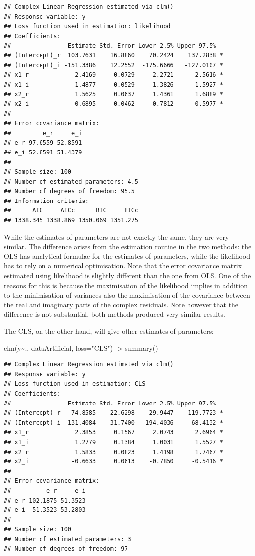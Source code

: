 \documentclass[
]{book}
\newenvironment{Shaded}{\begin{snugshade}}{\end{snugshade}}
\newcommand{\AttributeTok}[1]{\textcolor[rgb]{0.77,0.63,0.00}{#1}}
\newcommand{\FunctionTok}[1]{\textcolor[rgb]{0.00,0.00,0.00}{#1}}
\newcommand{\NormalTok}[1]{#1}
\newcommand{\SpecialCharTok}[1]{\textcolor[rgb]{0.00,0.00,0.00}{#1}}
\newcommand{\StringTok}[1]{\textcolor[rgb]{0.31,0.60,0.02}{#1}}
\begin{document}
\begin{verbatim}
## Complex Linear Regression estimated via clm()
## Response variable: y
## Loss function used in estimation: likelihood
## Coefficients:
##                Estimate Std. Error Lower 2.5% Upper 97.5%  
## (Intercept)_r  103.7631    16.8860    70.2424    137.2838 *
## (Intercept)_i -151.3386    12.2552  -175.6666   -127.0107 *
## x1_r             2.4169     0.0729     2.2721      2.5616 *
## x1_i             1.4877     0.0529     1.3826      1.5927 *
## x2_r             1.5625     0.0637     1.4361      1.6889 *
## x2_i            -0.6895     0.0462    -0.7812     -0.5977 *
## 
## Error covariance matrix:
##         e_r     e_i
## e_r 97.6559 52.8591
## e_i 52.8591 51.4379
## 
## Sample size: 100
## Number of estimated parameters: 4.5
## Number of degrees of freedom: 95.5
## Information criteria:
##      AIC     AICc      BIC     BICc 
## 1338.345 1338.869 1350.069 1351.275
\end{verbatim}

While the estimates of parameters are not exactly the same, they are very similar. The difference arises from the estimation routine in the two methods: the OLS has analytical formulae for the estimates of parameters, while the likelihood has to rely on a numerical optimisation. Note that the error covariance matrix estimated using likelihood is slightly different than the one from OLS. One of the reasons for this is because the maximisation of the likelihood implies in addition to the minimisation of variances also the maximisation of the covariance between the real and imaginary parts of the complex residuals. Note however that the difference is not substantial, both methods produced very similar results.

The CLS, on the other hand, will give other estimates of parameters:

\begin{Shaded}
\begin{Highlighting}[]
\FunctionTok{clm}\NormalTok{(y}\SpecialCharTok{\textasciitilde{}}\NormalTok{., dataArtificial, }\AttributeTok{loss=}\StringTok{"CLS"}\NormalTok{) }\SpecialCharTok{|\textgreater{}}
    \FunctionTok{summary}\NormalTok{()}
\end{Highlighting}
\end{Shaded}

\begin{verbatim}
## Complex Linear Regression estimated via clm()
## Response variable: y
## Loss function used in estimation: CLS
## Coefficients:
##                Estimate Std. Error Lower 2.5% Upper 97.5%  
## (Intercept)_r   74.8585    22.6298    29.9447    119.7723 *
## (Intercept)_i -131.4084    31.7400  -194.4036    -68.4132 *
## x1_r             2.3853     0.1567     2.0743      2.6964 *
## x1_i             1.2779     0.1384     1.0031      1.5527 *
## x2_r             1.5833     0.0823     1.4198      1.7467 *
## x2_i            -0.6633     0.0613    -0.7850     -0.5416 *
## 
## Error covariance matrix:
##          e_r     e_i
## e_r 102.1875 51.3523
## e_i  51.3523 53.2803
## 
## Sample size: 100
## Number of estimated parameters: 3
## Number of degrees of freedom: 97
\end{verbatim}
\end{document}

